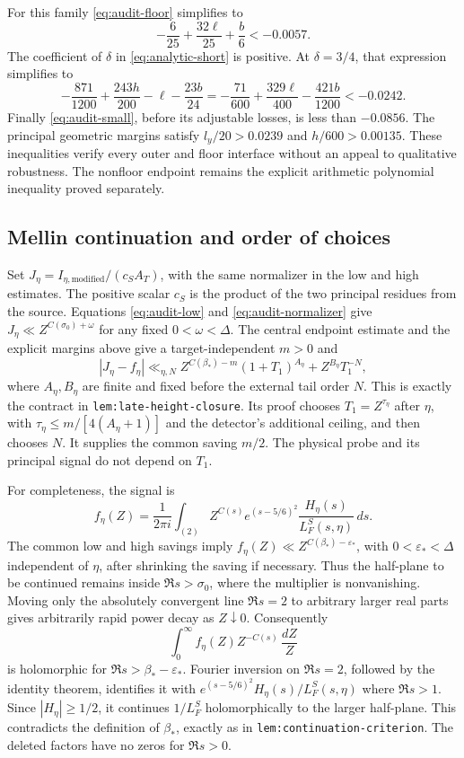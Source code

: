 \documentclass[11pt,a4paper]{article}
\numberwithin{equation}{section}
\theoremstyle{remark}
\begin{document}
For this family \eqref{eq:audit-floor} simplifies to
\[
 -\frac6{25}+\frac{32\ell}{25}+\frac b6<-0.0057.
\]
The coefficient of \(\delta\) in \eqref{eq:analytic-short} is positive.
At \(\delta=3/4\), that expression simplifies to
\[
 -\frac{871}{1200}+\frac{243h}{200}
                  -\ell-\frac{23b}{24}
 =-\frac{71}{600}+\frac{329\ell}{400}-\frac{421b}{1200}
 <-0.0242.
\]
Finally \eqref{eq:audit-small}, before its adjustable losses, is
less than \(-0.0856\).  The principal geometric margins satisfy
\(l_y/20>0.0239\) and \(h/600>0.00135\).
These inequalities verify every outer and floor interface without an
appeal to qualitative robustness.  The nonfloor endpoint remains the
explicit arithmetic polynomial inequality proved separately.

\subsection{Mellin continuation and order of choices}

Set \(J_\eta=I_{\eta,\mathrm{modified}}/(c_S A_T)\), with the same
normalizer in the low and high estimates.  The positive scalar \(c_S\)
is the product of the two principal residues from the source.  Equations
\eqref{eq:audit-low} and \eqref{eq:audit-normalizer} give
\(J_\eta\ll Z^{C(\sigma_0)+\omega}\) for any fixed
\(0<\omega<\Delta\).  The central endpoint estimate and the explicit
margins above give a target-independent \(m>0\) and
\[
 |J_\eta-f_\eta|
 \ll_{\eta,N}Z^{C(\beta_*)-m}(1+T_1)^{A_\eta}
                  +Z^{B_\eta}T_1^{-N},
\]
where \(A_\eta,B_\eta\) are finite and fixed before the external tail
order \(N\).  This is exactly the contract in
\texttt{lem:late-height-closure}.  Its proof chooses
\(T_1=Z^{\tau_\eta}\) after \(\eta\), with
\(\tau_\eta\le m/[4(A_\eta+1)]\) and the detector's additional ceiling,
and then chooses \(N\).  It supplies the common saving \(m/2\).
The physical probe and its principal signal do not depend on \(T_1\).

For completeness, the signal is
\[
 f_\eta(Z)=\frac1{2\pi i}\int_{(2)}
 Z^{C(s)}e^{(s-5/6)^2}\frac{H_\eta(s)}{L_F^S(s,\eta)}\,ds.
\]
The common low and high savings imply
\(f_\eta(Z)\ll Z^{C(\beta_*)-\varepsilon_*}\), with
\(0<\varepsilon_*<\Delta\) independent of \(\eta\), after shrinking
the saving if necessary. Thus the half-plane to be continued remains
inside \(\Re s>\sigma_0\), where the multiplier is nonvanishing.
Moving only the
absolutely convergent line \(\Re s=2\) to arbitrary larger real parts
gives arbitrarily rapid power decay as \(Z\downarrow0\).
Consequently
\[
 \int_0^\infty f_\eta(Z)Z^{-C(s)}\,\frac{dZ}{Z}
\]
is holomorphic for \(\Re s>\beta_*-\varepsilon_*\).  Fourier inversion
on \(\Re s=2\), followed by the identity theorem, identifies it with
\(e^{(s-5/6)^2}H_\eta(s)/L_F^S(s,\eta)\) where \(\Re s>1\).
Since \(|H_\eta|\ge1/2\), it continues \(1/L_F^S\) holomorphically
to the larger half-plane.  This contradicts the definition of
\(\beta_*\), exactly as in \texttt{lem:continuation-criterion}.
The deleted factors have no zeros for \(\Re s>0\).
\end{document}
